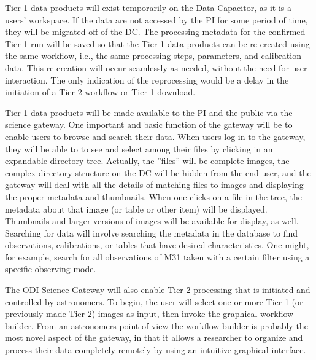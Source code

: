 \documentclass[10pt,conference]{IEEEtran}
\begin{document}
Tier 1 data products will exist temporarily on the Data Capacitor, as it is a users' workspace. If the data are not accessed by the PI for some period of time, they will be migrated off of the DC. The processing metadata for the confirmed Tier 1 run will be saved so that the Tier 1 data products can be re-created using the same workflow, i.e., the same processing steps, parameters, and calibration data. This re-creation will occur seamlessly as needed, without the need for user interaction. The only indication of the reprocessing would be a delay in the initiation of a Tier 2 workflow or Tier 1 download.

Tier 1 data products will be made available to the PI and the public via the science gateway. One important and basic function of the gateway will be to enable users to browse and search their data.  When users log in to the gateway, they will be able to to see and select among their files by clicking in an expandable directory tree. Actually, the ''files'' will be complete images, the complex directory structure on the DC will be hidden from the end user, and the gateway will deal with all the details of matching files to images and displaying the proper metadata and thumbnails. When one clicks on a file in the tree, the metadata about that image (or table or other item) will be displayed. Thumbnails and larger versions of images will be available for display, as well.  
Searching for data will involve searching the metadata in the database to find observations, calibrations, or tables that have desired characteristics. One might, for example, search for all observations of M31 taken with a certain filter using a specific observing mode.

The ODI Science Gateway will also enable Tier 2 processing that is initiated and controlled by astronomers. To begin, the user will select one or more Tier 1 (or previously made Tier 2) images as input, then invoke the graphical workflow builder. From an astronomers point of view the workflow builder is probably the most novel aspect of the gateway, in that it allows a researcher to organize and process their data completely remotely by using an intuitive graphical interface.
\end{document}

